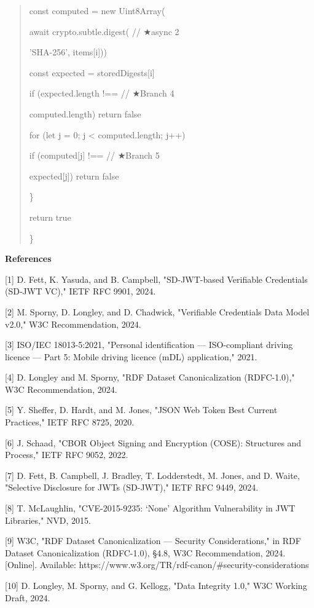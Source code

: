 \begin{quote}
const computed = new Uint8Array(

await crypto.subtle.digest( // ★async 2

'SHA-256', items{[}i{]}))

const expected = storedDigests{[}i{]}

if (expected.length !== // ★Branch 4

computed.length) return false

for (let j = 0; j \textless{} computed.length; j++)

if (computed{[}j{]} !== // ★Branch 5

expected{[}j{]}) return false

\}

return true

\}
\end{quote}

\textbf{References}

{[}1{]} D. Fett, K. Yasuda, and B. Campbell, "SD-JWT-based Verifiable Credentials (SD-JWT VC)," IETF RFC 9901, 2024.

{[}2{]} M. Sporny, D. Longley, and D. Chadwick, "Verifiable Credentials Data Model v2.0," W3C Recommendation, 2024.

{[}3{]} ISO/IEC 18013-5:2021, "Personal identification --- ISO-compliant driving licence --- Part 5: Mobile driving licence (mDL) application," 2021.

{[}4{]} D. Longley and M. Sporny, "RDF Dataset Canonicalization (RDFC-1.0)," W3C Recommendation, 2024.

{[}5{]} Y. Sheffer, D. Hardt, and M. Jones, "JSON Web Token Best Current Practices," IETF RFC 8725, 2020.

{[}6{]} J. Schaad, "CBOR Object Signing and Encryption (COSE): Structures and Process," IETF RFC 9052, 2022.

{[}7{]} D. Fett, B. Campbell, J. Bradley, T. Lodderstedt, M. Jones, and D. Waite, "Selective Disclosure for JWTs (SD-JWT)," IETF RFC 9449, 2024.

{[}8{]} T. McLaughlin, "CVE-2015-9235: `None' Algorithm Vulnerability in JWT Libraries," NVD, 2015.

{[}9{]} W3C, "RDF Dataset Canonicalization --- Security Considerations," in RDF Dataset Canonicalization (RDFC-1.0), §4.8, W3C Recommendation, 2024. {[}Online{]}. Available: https://www.w3.org/TR/rdf-canon/\#security-considerations

{[}10{]} D. Longley, M. Sporny, and G. Kellogg, "Data Integrity 1.0," W3C Working Draft, 2024.

